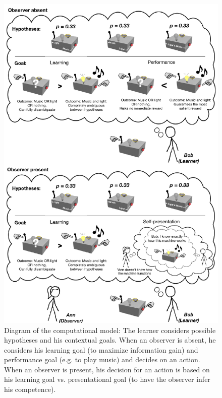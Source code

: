 \documentclass[10pt, letterpaper]{article}
\newenvironment{CodeChunk}{}{}
\begin{document}
\begin{CodeChunk}
\begin{figure}[h]

{\centering \includegraphics{figs/model_diagram-1} 

}

\caption[Diagram of the computational model]{Diagram of the computational model: The learner considers possible hypotheses and his contextual goals. When an observer is absent, he considers his learning goal (to maximize information gain) and performance goal (e.g. to play music) and decides on an action. When an observer is present, his decision for an action is based on his learning goal vs. presentational goal (to have the observer infer his competence).}\label{fig:model_diagram}
\end{figure}
\end{CodeChunk}
\end{document}
